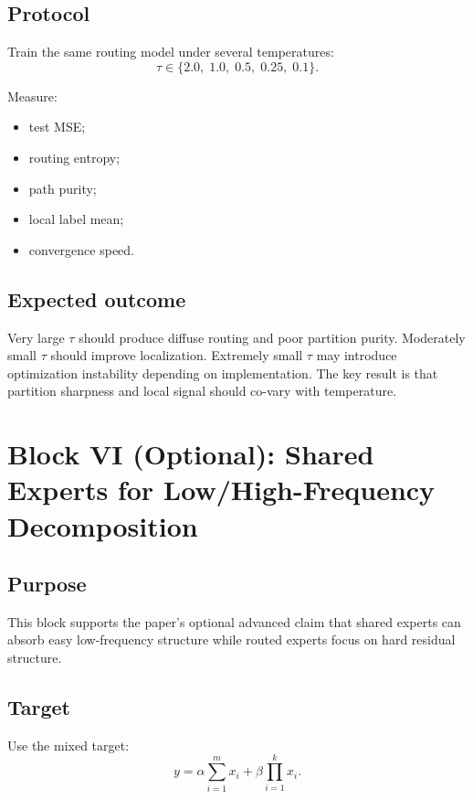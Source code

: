 \documentclass[11pt]{article}
\begin{document}
\subsection{Protocol}

Train the same routing model under several temperatures:
\begin{equation}
    \tau \in \{2.0,\;1.0,\;0.5,\;0.25,\;0.1\}.
\end{equation}

Measure:
\begin{itemize}[leftmargin=2em]
    \item test MSE;
    \item routing entropy;
    \item path purity;
    \item local label mean;
    \item convergence speed.
\end{itemize}

\subsection{Expected outcome}

Very large $\tau$ should produce diffuse routing and poor partition purity. Moderately small $\tau$ should improve localization. Extremely small $\tau$ may introduce optimization instability depending on implementation. The key result is that partition sharpness and local signal should co-vary with temperature.

\section{Block VI (Optional): Shared Experts for Low/High-Frequency Decomposition}

\subsection{Purpose}

This block supports the paper's optional advanced claim that shared experts can absorb easy low-frequency structure while routed experts focus on hard residual structure.

\subsection{Target}

Use the mixed target:
\begin{equation}
    y = \alpha \sum_{i=1}^{m} x_i + \beta \prod_{i=1}^{k} x_i.
\end{equation}
\end{document}
